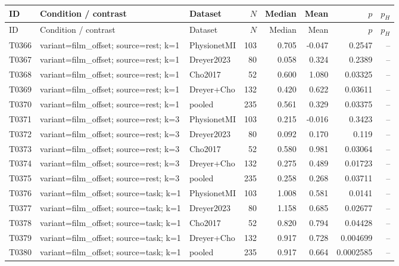 \begin{longtable}{p{.45in}p{2.6in}p{.75in}rrrrr}
\toprule
ID & Condition / contrast & Dataset & $N$ & Median & Mean & $p$ & $p_H$ \\
\midrule
\endfirsthead
\toprule
ID & Condition / contrast & Dataset & $N$ & Median & Mean & $p$ & $p_H$ \\
\midrule
\endhead
T0366 & variant=film\_\allowbreak{}offset; source=rest; k=1 & PhysionetMI & 103 & 0.705 & -0.047 & 0.2547 & -- \\
T0367 & variant=film\_\allowbreak{}offset; source=rest; k=1 & Dreyer2023 & 80 & 0.058 & 0.324 & 0.2389 & -- \\
T0368 & variant=film\_\allowbreak{}offset; source=rest; k=1 & Cho2017 & 52 & 0.600 & 1.080 & 0.03325 & -- \\
T0369 & variant=film\_\allowbreak{}offset; source=rest; k=1 & Dreyer+Cho & 132 & 0.420 & 0.622 & 0.03611 & -- \\
T0370 & variant=film\_\allowbreak{}offset; source=rest; k=1 & pooled & 235 & 0.561 & 0.329 & 0.03375 & -- \\
T0371 & variant=film\_\allowbreak{}offset; source=rest; k=3 & PhysionetMI & 103 & 0.215 & -0.016 & 0.3423 & -- \\
T0372 & variant=film\_\allowbreak{}offset; source=rest; k=3 & Dreyer2023 & 80 & 0.092 & 0.170 & 0.119 & -- \\
T0373 & variant=film\_\allowbreak{}offset; source=rest; k=3 & Cho2017 & 52 & 0.580 & 0.981 & 0.03064 & -- \\
T0374 & variant=film\_\allowbreak{}offset; source=rest; k=3 & Dreyer+Cho & 132 & 0.275 & 0.489 & 0.01723 & -- \\
T0375 & variant=film\_\allowbreak{}offset; source=rest; k=3 & pooled & 235 & 0.258 & 0.268 & 0.03711 & -- \\
T0376 & variant=film\_\allowbreak{}offset; source=task; k=1 & PhysionetMI & 103 & 1.008 & 0.581 & 0.0141 & -- \\
T0377 & variant=film\_\allowbreak{}offset; source=task; k=1 & Dreyer2023 & 80 & 1.158 & 0.685 & 0.02677 & -- \\
T0378 & variant=film\_\allowbreak{}offset; source=task; k=1 & Cho2017 & 52 & 0.820 & 0.794 & 0.04428 & -- \\
T0379 & variant=film\_\allowbreak{}offset; source=task; k=1 & Dreyer+Cho & 132 & 0.917 & 0.728 & 0.004699 & -- \\
T0380 & variant=film\_\allowbreak{}offset; source=task; k=1 & pooled & 235 & 0.917 & 0.664 & 0.0002585 & -- \\

\end{longtable}
